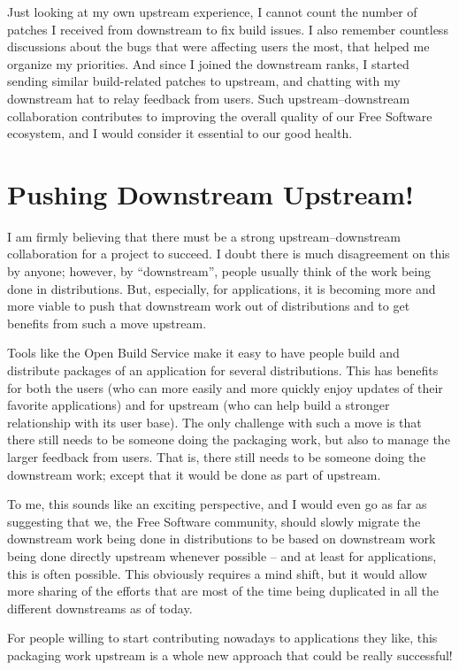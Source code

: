 Just looking at my own upstream experience, I cannot count the number of
patches I received from downstream to fix build issues. I also remember
countless discussions about the bugs that were affecting users the most, that
helped me organize my priorities. And since I joined the downstream ranks, I
started sending similar build-related patches to upstream, and chatting with my
downstream hat to relay feedback from users. Such upstream--downstream
collaboration contributes to improving the overall quality of our Free Software
ecosystem, and I would consider it essential to our good health.

\section*{Pushing Downstream Upstream!}

I am firmly believing that there must be a strong upstream--downstream
collaboration for a project to succeed. I doubt there is much disagreement on
this by anyone; however, by ``downstream'', people usually think of the work
being done in distributions. But, especially, for applications, it is becoming
more and more viable to push that downstream work out of distributions and to
get benefits from such a move upstream.

Tools like the Open Build Service make it easy to have people build and
distribute packages of an application for several distributions. This has
benefits for both the users (who can more easily and more quickly enjoy updates
of their favorite applications) and for upstream (who can help build a stronger
relationship with its user base). The only challenge with such a move is that
there still needs to be someone doing the packaging work, but also to manage
the larger feedback from users. That is, there still needs to be someone doing
the downstream work; except that it would be done as part of upstream.

To me, this sounds like an exciting perspective, and I would even go as far as
suggesting that we, the Free Software community, should slowly migrate the
downstream work being done in distributions to be based on downstream work
being done directly upstream whenever possible -- and at least for
applications, this is often possible. This obviously requires a mind shift, but
it would allow more sharing of the efforts that are most of the time being
duplicated in all the different downstreams as of today.

For people willing to start contributing nowadays to applications they like,
this packaging work upstream is a whole new approach that could be really
successful!

